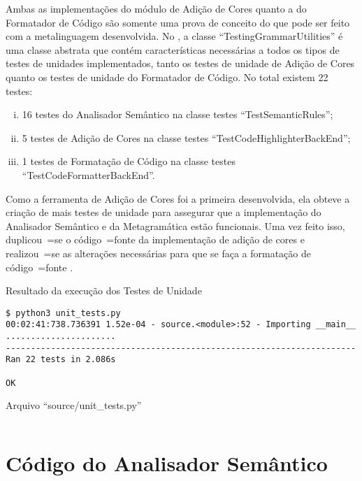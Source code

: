 Ambas as implementações do módulo de Adição de Cores quanto a do Formatador de Código são somente uma prova de conceito do que pode ser feito com a metalinguagem desenvolvida.
No ,
a classe ``TestingGrammarUtilities'' é uma classe abstrata \cite{understandingDataAbstraction} que contém características necessárias a todos os tipos de testes de unidades implementados,
tanto os testes de unidade de Adição de Cores quanto os testes de unidade do Formatador de Código.
No total existem 22 testes:
\begin{enumerate}[i)]
\item 16 testes do Analisador Semântico  na classe testes ``TestSemanticRules'';
\item 5 testes de Adição de Cores  na classe testes ``TestCodeHighlighterBackEnd'';
\item 1 testes de Formatação de Código  na classe testes ``TestCodeFormatterBackEnd''.
\end{enumerate}%

Como a ferramenta de Adição de Cores foi a primeira desenvolvida,
ela obteve a criação de mais testes de unidade para assegurar que a implementação do Analisador Semântico  e
da Metagramática estão funcionais.
Uma vez feito isso,
duplicou~=se o código~=fonte da implementação de adição de cores  e
realizou~=se as alterações necessárias para que se faça a formatação de código~=fonte .
\begin{code}
\caption{Resultado da execução dos Testes de Unidade}
\label{unitTestsResults}
\begin{verbatim}
$ python3 unit_tests.py
00:02:41:738.736391 1.52e-04 - source.<module>:52 - Importing __main__
......................
----------------------------------------------------------------------
Ran 22 tests in 2.086s

OK
\end{verbatim}
\end{code}
\begin{code}
\caption{Arquivo ``source/unit\_tests.py''}
\label{unitTestsPy}
\inputminted{python3}{../source/unit_tests.py}
\end{code}


\chapter{Código do Analisador Semântico}

